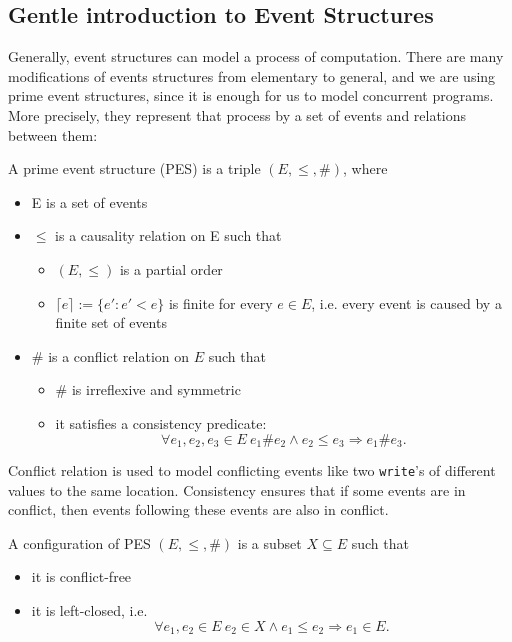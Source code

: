\subsection{Gentle introduction to Event Structures}

Generally, event structures can model a process of computation. 
There are many modifications of events structures from elementary to general, 
and we are using prime event structures, since it is enough for us to model 
concurrent programs. More precisely, they represent that process by a set of events 
and relations between them: 
\begin{definition} \label{es_def}
A prime event structure (PES) is a triple $(E, \leq, \#)$, where
\begin{itemize}
  \item E is a set of events
  \item $\leq$ is a causality relation on E such that 
  \begin{itemize}
    \item $ (E, \leq) $ is a partial order
    \item $\lceil e \rceil := \{ e' : e' < e \}$ is finite for every $e \in E$, 
    i.e. every event is caused by a finite set of events
  \end{itemize}
  \item $\#$ is a conflict relation on $E$ such that
  \begin{itemize}
    \item $\#$ is irreflexive and symmetric
    \item it satisfies a consistency predicate:
    $$\forall e_1, e_2, e_3 \in E \ e_1 \# e_2 \land e_2 \leq e_3 \Rightarrow e_1 \# e_3.$$
  \end{itemize}
\end{itemize}
\end{definition}

Conflict relation is used to model conflicting events like two \texttt{write}'s 
of different values to the same location.
Consistency ensures that if some events are in conflict, then events 
following these events are also in conflict.

\begin{definition}
A configuration of PES $(E, \leq, \#)$ is a subset $X \subseteq E$ such that
\begin{itemize}
  \item it is conflict-free
  \item it is left-closed, i.e. $$\forall e_1, e_2 \in E \ e_2 \in X \land e_1 \leq e_2 \Rightarrow e_1 \in E.$$
\end{itemize}
\end{definition}

